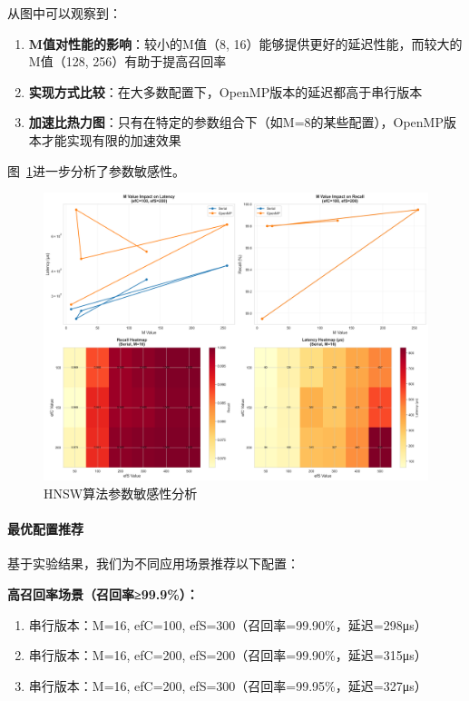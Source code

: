 从图中可以观察到：
\begin{enumerate}
    \item \textbf{M值对性能的影响}：较小的M值（8, 16）能够提供更好的延迟性能，而较大的M值（128, 256）有助于提高召回率
    \item \textbf{实现方式比较}：在大多数配置下，OpenMP版本的延迟都高于串行版本
    \item \textbf{加速比热力图}：只有在特定的参数组合下（如M=8的某些配置），OpenMP版本才能实现有限的加速效果
\end{enumerate}

图~\ref{fig:hnsw_parameter_sensitivity}进一步分析了参数敏感性。

\begin{figure}[htbp]
\centering
\includegraphics[width=\textwidth]{plots/hnsw_parameter_sensitivity_en.png}
\caption{HNSW算法参数敏感性分析}
\label{fig:hnsw_parameter_sensitivity}
\end{figure}

\paragraph{最优配置推荐}

基于实验结果，我们为不同应用场景推荐以下配置：

\textbf{高召回率场景（召回率≥99.9\%）：}
\begin{enumerate}
    \item 串行版本：M=16, efC=100, efS=300（召回率=99.90\%，延迟=298μs）
    \item 串行版本：M=16, efC=200, efS=200（召回率=99.90\%，延迟=315μs）
    \item 串行版本：M=16, efC=200, efS=300（召回率=99.95\%，延迟=327μs）
\end{enumerate}

